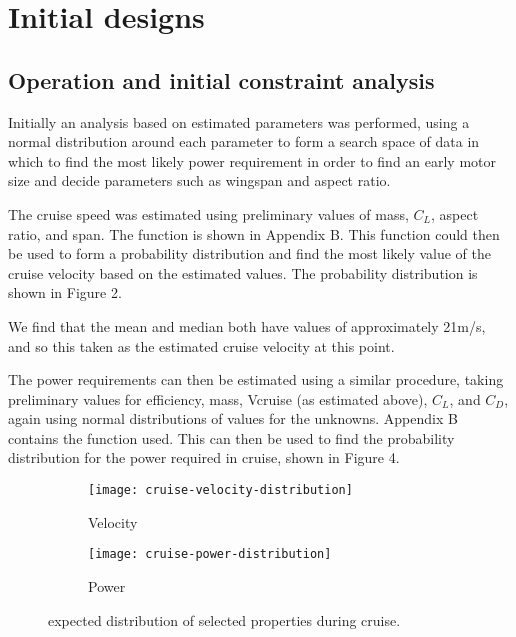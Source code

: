 \documentclass[../../main.tex]{subfiles}
\begin{document}

\section{Initial designs} \label{sec:design-process:initial-designs}

\subsection{Operation and initial constraint analysis} \label{sec:design-process:initial-designs:operation-and-initial-constraint-analysis}

Initially an analysis based on estimated parameters was performed, using a normal distribution around each parameter to form a search space of data in which to find the most likely power requirement in order to find an early motor size and decide parameters such as wingspan and aspect ratio. 

The cruise speed was estimated using preliminary values of mass, $C_L$, aspect ratio, and span. The function is shown in Appendix B.
This function could then be used to form a probability distribution and find the most likely value of the cruise velocity based on the estimated values.
The probability distribution is shown in Figure 2.

We find that the mean and median both have values of approximately 21m/s, and so this taken as the estimated cruise velocity at this point. 

The power requirements can then be estimated using a similar procedure, taking preliminary values for efficiency, mass, Vcruise (as estimated above), $C_L$, and $C_D$, again using normal distributions of values for the unknowns.
Appendix B contains the function used.
This can then be used to find the probability distribution for the power required in cruise, shown in Figure 4.

\begin{figure}[H]
    \centering
    \begin{subfigure}[b]{0.49\columnwidth}
        \centering
        \texttt{[image: cruise-velocity-distribution]}
        \caption{Velocity}
        \label{fig:cruise-distribution:velocity}
    \end{subfigure}
    \hfill
    \begin{subfigure}[b]{0.49\columnwidth}
        \centering
        \texttt{[image: cruise-power-distribution]}
        \caption{Power}
        \label{fig:cruise-distribution:power}
    \end{subfigure}

    \caption{expected distribution of selected properties during cruise.}
    \label{fig:cruise-distribution}
\end{figure}
\end{document}
